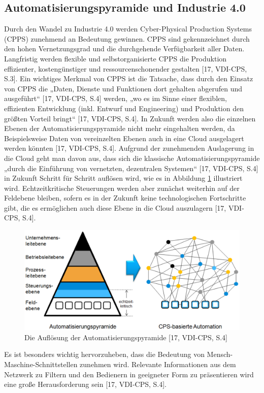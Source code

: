 \subsection{Automatisierungspyramide und Industrie 4.0}\label{sec:AutomatisierungspyramideUndIndustrie4.0}
Durch den Wandel zu Industrie 4.0 werden Cyber-Physical Production Systems (CPPS) zunehmend an Bedeutung gewinnen. CPPS sind gekennzeichnet durch den hohen Vernetzungsgrad und die durchgehende Verfügbarkeit aller Daten. Langfristig werden flexible und selbstorganisierte CPPS die Produktion effizienter, kostengünstiger und ressourcenschonender gestalten [17, VDI-CPS, S.3].
\newline
Ein wichtiges Merkmal von CPPS ist die Tatsache, dass durch den Einsatz von CPPS die „Daten, Dienste und Funktionen dort gehalten abgerufen und ausgeführt“ [17, VDI-CPS, S.4] werden, „wo es im Sinne einer flexiblen, effizienten Entwicklung (inkl. Entwurf und Engineering) und Produktion den größten Vorteil bringt“ [17, VDI-CPS, S.4]. In Zukunft werden also die einzelnen Ebenen der Automatisierungspyramide nicht mehr eingehalten werden, da Beispielsweise Daten von vereinzelten Ebenen auch in eine Cloud ausgelagert werden könnten [17, VDI-CPS, S.4].
\newline
Aufgrund der zunehmenden Auslagerung in die Cloud geht man davon aus, dass sich die klassische Automatisierungspyramide „durch die Einführung von vernetzten, dezentralen Systemen“ [17, VDI-CPS, S.4] in Zukunft Schritt für Schritt auflösen wird, wie es in Abbildung \ref{fig:AutomatisierungspyramideCPPS} illustriert wird. Echtzeitkritische Steuerungen werden aber zunächst weiterhin auf der Feldebene bleiben, sofern es in der Zukunft keine technologischen Fortschritte gibt, die es ermöglichen auch diese Ebene in die Cloud auszulagern [17, VDI-CPS, S.4].
\begin{figure}[h]
	\centering
	\includegraphics[width=1\linewidth]{Bilder/A10_AutomatisierungspyramideCPPS}
	\caption{Die Auflösung der Automatisierungspyramide [17, VDI-CPS, S.4]}
	\label{fig:AutomatisierungspyramideCPPS}
\end{figure}
\newline
\noindent Es ist besonders wichtig hervorzuheben, dass die Bedeutung von Mensch-Maschine-Schnittstellen zunehmen wird. Relevante Informationen aus dem Netzwerk zu Filtern und den Bedienern in geeigneter Form zu präsentieren wird eine große Herausforderung sein [17, VDI-CPS, S.4].


